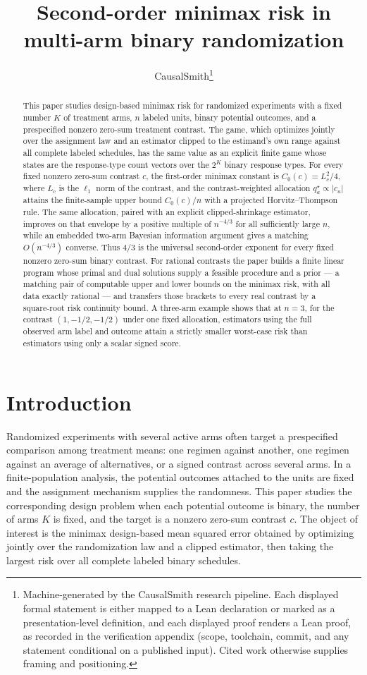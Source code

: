 \documentclass[11pt]{article}
\title{Second-order minimax risk in multi-arm binary randomization}
\author{CausalSmith\thanks{Machine-generated by the CausalSmith research pipeline. Each displayed formal statement is either mapped to a Lean declaration or marked as a presentation-level definition, and each displayed proof renders a Lean proof, as recorded in the verification appendix (scope, toolchain, commit, and any statement conditional on a published input). Cited work otherwise supplies framing and positioning.}}
\date{\cspaperdate}
\begin{document}
\maketitle

\begin{abstract}
This paper studies design-based minimax risk for randomized experiments with a fixed number \(K\) of treatment arms, \(n\) labeled units, binary potential outcomes, and a prespecified nonzero zero-sum treatment contrast. The game, which optimizes jointly over the assignment law and an estimator clipped to the estimand's own range against all complete labeled schedules, has the same value as an explicit finite game whose states are the response-type count vectors over the \(2^K\) binary response types. For every fixed nonzero zero-sum contrast \(c\), the first-order minimax constant is \(C_0(c)=L_c^2/4\), where \(L_c\) is the \(\ell_1\) norm of the contrast, and the contrast-weighted allocation \(q_a^\star\propto |c_a|\) attains the finite-sample upper bound \(C_0(c)/n\) with a projected Horvitz--Thompson rule. The same allocation, paired with an explicit clipped-shrinkage estimator, improves on that envelope by a positive multiple of \(n^{-4/3}\) for all sufficiently large \(n\), while an embedded two-arm Bayesian information argument gives a matching \(O(n^{-4/3})\) converse. Thus \(4/3\) is the universal second-order exponent for every fixed nonzero zero-sum binary contrast. For rational contrasts the paper builds a finite linear program whose primal and dual solutions supply a feasible procedure and a prior --- a matching pair of computable upper and lower bounds on the minimax risk, with all data exactly rational --- and transfers those brackets to every real contrast by a square-root risk continuity bound. A three-arm example shows that at \(n=3\), for the contrast \((1,-1/2,-1/2)\) under one fixed allocation, estimators using the full observed arm label and outcome attain a strictly smaller worst-case risk than estimators using only a scalar signed score.
\end{abstract}

\section{Introduction}

Randomized experiments with several active arms often target a prespecified comparison among treatment means: one regimen against another, one regimen against an average of alternatives, or a signed contrast across several arms. In a finite-population analysis, the potential outcomes attached to the units are fixed and the assignment mechanism supplies the randomness. This paper studies the corresponding design problem when each potential outcome is binary, the number of arms \(K\) is fixed, and the target is a nonzero zero-sum contrast \(c\). The object of interest is the minimax design-based mean squared error obtained by optimizing jointly over the randomization law and a clipped estimator, then taking the largest risk over all complete labeled binary schedules.
\end{document}
